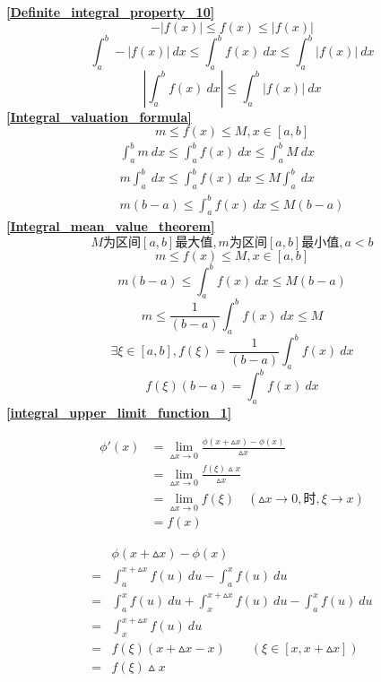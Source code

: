 \textbf{\large \ref{Definite_integral_property_10}}
	$$-\left|f(x)\right|\leqslant f(x)\leqslant\left|f(x)\right|$$
	$$\int_{a}^{b} -\left|f(x)\right|\ dx\leqslant \int_{a}^{b}f(x)\ dx\leqslant \int_{a}^{b} \left|f(x)\right| \ dx$$
	$$\left|\int_{a}^{b}f(x)\ dx\right|\leqslant \int_{a}^{b} \left|f(x)\right| \ dx$$
\textbf{\large \ref{Integral_valuation_formula}}
$$m\leqslant f(x)\leqslant M,x\in\left[a,b\right]$$
\begin{align*}
	\int_{a}^{b}m\ dx \leqslant \int_{a}^{b}f(x)\ dx\leqslant \int_{a}^{b}M\ dx\\
	m\int_{a}^{b}\ dx \leqslant \int_{a}^{b}f(x)\ dx\leqslant M\int_{a}^{b}\ dx\\
	m(b-a)\leqslant \int_{a}^{b}f(x)\ dx\leqslant M(b-a)
\end{align*}
\textbf{\large \ref{Integral_mean_value_theorem}}
	$$M\mbox{为区间$\left[a,b\right]$最大值},m\mbox{为区间$\left[a,b\right]$最小值},a<b$$
	$$m\leqslant f(x)\leqslant M,x\in\left[a,b\right]$$
	$$m(b-a)\leqslant \int_{a}^{b}f(x)\ dx\leqslant M(b-a)$$
	$$m\leqslant \frac{1}{(b-a)}\int_{a}^{b}f(x)\ dx\leqslant M$$
	$$\exists \xi\in\left[a,b\right], f(\xi)=\frac{1}{(b-a)}\int_{a}^{b}f(x)\ dx$$
	$$f(\xi)(b-a)=\int_{a}^{b}f(x)\ dx$$
\textbf{\large \ref{integral_upper_limit_function_1}}\\
\begin{minipage}{.4\textwidth}
	\begin{align*}
		\phi'(x)&=\lim\limits_{\vartriangle x\to 0}\frac{\phi(x+\vartriangle x)-\phi(x)}{\vartriangle x}\\
		&=\lim\limits_{\vartriangle x\to 0}\frac{f(\xi)\vartriangle x}{\vartriangle x}\\
		&=\lim\limits_{\vartriangle x\to 0}f(\xi)\quad(\vartriangle x\rightarrow 0,\mbox{时},\xi \rightarrow x)\\
		&=f(x)
	\end{align*}
\end{minipage}
\hfill
\hspace{0.5mm}
\vline
\hspace{0.5mm}
\begin{minipage}{.4\textwidth}
	\begin{align*}
		&\phi(x+\vartriangle x)-\phi(x)\\
		=&\int_{a}^{x+\vartriangle x}f(u)\ du-\int_{a}^{x}f(u)\ du\\
		=&\int_{a}^{x}f(u)\ du+\int_{x}^{x+\vartriangle x}f(u)\ du-\int_{a}^{x}f(u)\ du\\
		=&\int_{x}^{x+\vartriangle x}f(u)\ du\\
		=&f(\xi)(x+\vartriangle x-x)\qquad(\xi\in\left[x,x+\vartriangle x\right])\\
		=&f(\xi)\vartriangle x
	\end{align*}
\end{minipage}
